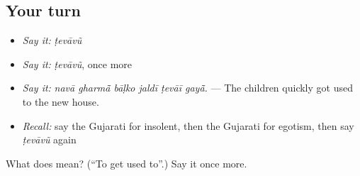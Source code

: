 \subsection*{Your turn}
\begin{itemize}
\raggedright
  \item \emph{Say it:} \emph{ṭevāvũ}
  \item \emph{Say it:} \emph{ṭevāvũ}, once more
  \item \emph{Say it:} \emph{navā gharmā̃ bāḷko jaldī ṭevāī gayā̃.} — The children quickly got used to the new house.
  \item \emph{Recall:} say the Gujarati for insolent, then the Gujarati for egotism, then say \emph{ṭevāvũ} again
\end{itemize}

\begin{tcolorbox}[breakable,colback=teal!4,colframe=teal!35!black,title={Before you move on}]
What does  mean? (\textquotedblleft{}To get used to\textquotedblright{}.) Say it once more.
\end{tcolorbox}
